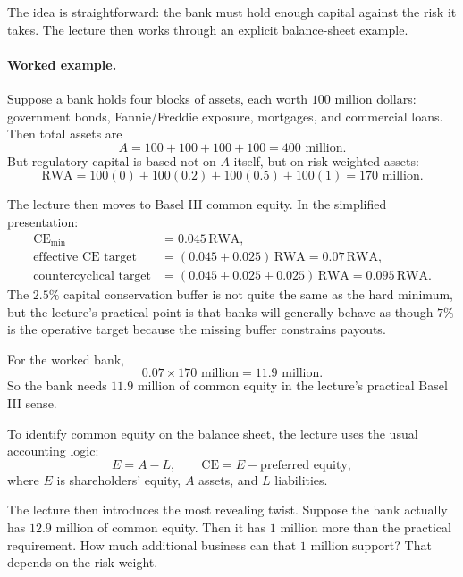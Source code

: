 The idea is straightforward: the bank must hold enough capital against the risk it takes. The lecture then works through an explicit balance-sheet example.

\paragraph{Worked example.} Suppose a bank holds four blocks of assets, each worth \(100\) million dollars: government bonds, Fannie/Freddie exposure, mortgages, and commercial loans. Then total assets are
\begin{equation}
A = 100 + 100 + 100 + 100 = 400\text{ million}.
\end{equation}
But regulatory capital is based not on \(A\) itself, but on risk-weighted assets:
\begin{equation}
\text{RWA} = 100(0) + 100(0.2) + 100(0.5) + 100(1) = 170\text{ million}.
\end{equation}

The lecture then moves to Basel III common equity. In the simplified presentation:
\begin{align}
\text{CE}_{\min} &= 0.045\,\text{RWA},\\
\text{effective CE target} &= (0.045 + 0.025)\,\text{RWA} = 0.07\,\text{RWA},\\
\text{countercyclical target} &= (0.045 + 0.025 + 0.025)\,\text{RWA} = 0.095\,\text{RWA}.
\end{align}
The \(2.5\%\) capital conservation buffer is not quite the same as the hard minimum, but the lecture's practical point is that banks will generally behave as though \(7\%\) is the operative target because the missing buffer constrains payouts.

For the worked bank,
\begin{equation}
0.07 \times 170\text{ million} = 11.9\text{ million}.
\end{equation}
So the bank needs \(11.9\) million of common equity in the lecture's practical Basel III sense.

To identify common equity on the balance sheet, the lecture uses the usual accounting logic:
\begin{equation}
E = A - L,\qquad \text{CE} = E - \text{preferred equity},
\end{equation}
where \(E\) is shareholders' equity, \(A\) assets, and \(L\) liabilities.

The lecture then introduces the most revealing twist. Suppose the bank actually has \(12.9\) million of common equity. Then it has \(1\) million more than the practical requirement. How much additional business can that \(1\) million support? That depends on the risk weight.

